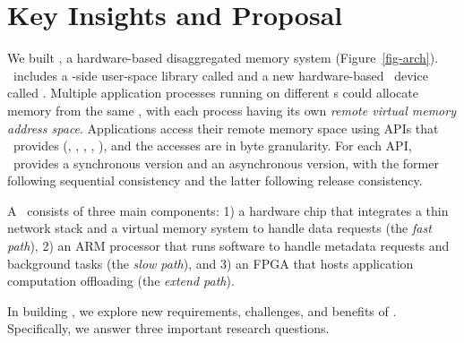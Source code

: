 \section{Key Insights and Proposal}



We built {\em \sys}, a hardware-based disaggregated memory system (Figure~\ref{fig-arch}).
\sys\ includes a \CN-side user-space library called {\em \syslib}
and a new hardware-based \MN\ device called {\em \sysboard}.
Multiple application processes running on different \CN{}s could allocate memory from the same \sysboard, with each process having its own {\em remote virtual memory address space}.
Applications access their remote memory space using APIs that \sys\ provides (\eg, \alloc, \sysread, \syswrite, \syslock), and the accesses are in byte granularity.
For each API, \sys\ provides a synchronous version and an asynchronous version, with the former following sequential consistency and the latter following release consistency.

A \sysboard\ consists of three main components: 1) a hardware chip that integrates a thin network stack and a virtual memory system to handle data requests (the {\em fast path}), 2) an ARM processor that runs software to handle metadata requests and background tasks (the {\em slow path}), and 3) an FPGA that hosts application computation offloading (the {\em extend path}).

In building \sys, we explore new requirements, challenges, and benefits of \md.
Specifically, we answer three important research questions.

